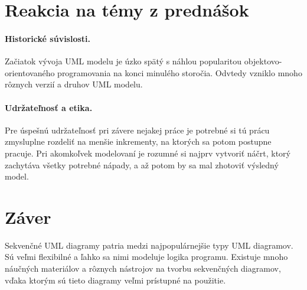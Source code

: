 \documentclass[10pt,slovak,a4paper]{article}
\begin{document}
\section{Reakcia na témy z prednášok} \label{lect}

\paragraph{Historické súvislosti.}
Začiatok vývoja UML modelu je úzko spätý s náhlou popularitou objektovo-orientovaného programovania na konci minulého storočia. 
Odvtedy vzniklo mnoho rôznych verzií a druhov UML modelu.

\paragraph{Udržateľnosť a etika.}
Pre úspešnú udržateľnosť pri závere nejakej práce je potrebné si tú prácu zmysluplne rozdeliť na menšie inkrementy, na ktorých sa potom postupne pracuje. 
Pri akomkoľvek modelovaní je rozumné si najprv vytvoriť náčrt, ktorý zachytáva všetky potrebné nápady, a až potom by sa mal zhotoviť výsledný model.  

\section{Záver} \label{end}
Sekvenčné UML diagramy patria medzi najpopulárnejšie typy UML diagramov. Sú veľmi flexibilné a ľahko sa nimi modeluje logika programu. 
Existuje mnoho náučných materiálov a rôznych nástrojov na tvorbu sekvenčných diagramov, vďaka ktorým sú tieto diagramy veľmi prístupné na použitie. 



\end{document}
